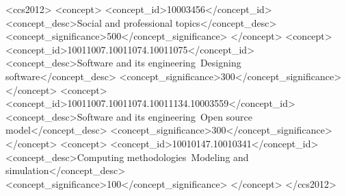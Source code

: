 \begin{CCSXML}
<ccs2012>
<concept>
<concept_id>10003456</concept_id>
<concept_desc>Social and professional topics</concept_desc>
<concept_significance>500</concept_significance>
</concept>
<concept>
<concept_id>10011007.10011074.10011075</concept_id>
<concept_desc>Software and its engineering~Designing software</concept_desc>
<concept_significance>300</concept_significance>
</concept>
<concept>
<concept_id>10011007.10011074.10011134.10003559</concept_id>
<concept_desc>Software and its engineering~Open source model</concept_desc>
<concept_significance>300</concept_significance>
</concept>
<concept>
<concept_id>10010147.10010341</concept_id>
<concept_desc>Computing methodologies~Modeling and simulation</concept_desc>
<concept_significance>100</concept_significance>
</concept>
</ccs2012>
\end{CCSXML}




\maketitle
